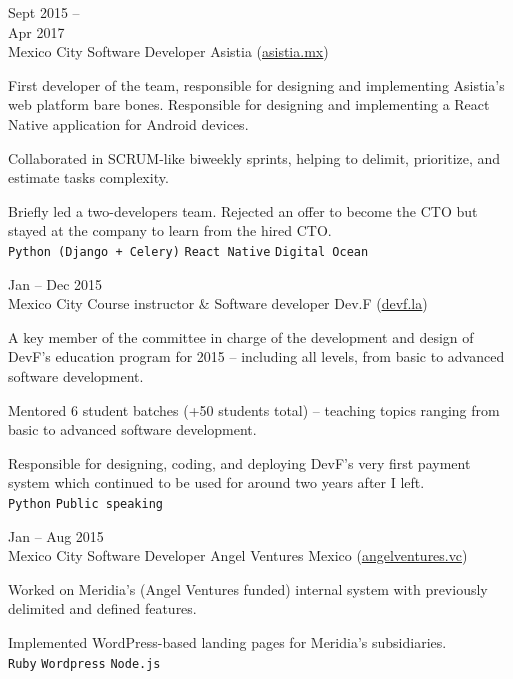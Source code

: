 \documentclass[9pt]{developercv} %
\begin{document}
\begin{entrylist}
    \entry
        {
            Sept 2015 --\\Apr 2017
            \\\footnotesize{Mexico City}
        }
        {Software Developer}
        {Asistia ({\href{https://www.linkedin.com/company/asistia/}{\underline{asistia.mx}}})}
        {
            First developer of the team, responsible for designing and implementing Asistia's web platform bare bones. Responsible for designing and implementing a React Native application for Android devices. 

            Collaborated in SCRUM-like biweekly sprints, helping to delimit, prioritize, and estimate tasks complexity.
            
            Briefly led a two-developers team. Rejected an offer to become the CTO but stayed at the company to learn from the hired CTO.\\
            \texttt{Python (Django + Celery)}
            \slashsep\texttt{React Native}
            \slashsep\texttt{Digital Ocean}}

    \entry
        {
            Jan -- Dec 2015
            \\\footnotesize{Mexico City}
        }
        {Course instructor \& Software developer}
        {Dev.F ({\href{https://devf.la/}{\underline{devf.la}}})}
        {
            A key member of the committee in charge of the development and design of DevF's education program for 2015 – including all levels, from basic to advanced software development. 

            Mentored 6 student batches (+50 students total) – teaching topics ranging from basic to advanced software development.
            
            Responsible for designing, coding, and deploying DevF's very first payment system which continued to be used for around two years after I left.\\
            \texttt{Python}
            \slashsep\texttt{Public speaking}
        }

    \entry
        {
            Jan -- Aug 2015
            \\\footnotesize{Mexico City}
        }
        {Software Developer}
        {Angel Ventures Mexico ({\href{http://www.angelventures.vc/}{\underline{angelventures.vc}}})}
        {
            Worked on Meridia's (Angel Ventures funded) internal system with previously delimited and defined features. 

            Implemented WordPress-based landing pages for Meridia's subsidiaries.\\
            \texttt{Ruby}
            \slashsep\texttt{Wordpress}
            \slashsep\texttt{Node.js}
        }

\end{entrylist}
\end{document}
